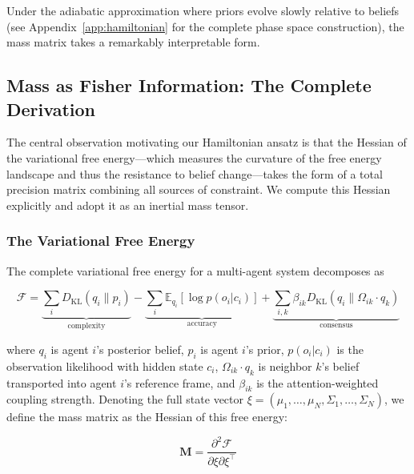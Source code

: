 \documentclass[12pt]{article}
\begin{document}
Under the adiabatic approximation where priors evolve slowly relative to beliefs 
(see Appendix~\ref{app:hamiltonian} for the complete phase space construction), 
the mass matrix takes a remarkably interpretable form.


\subsection{Mass as Fisher Information: The Complete Derivation}

The central observation motivating our Hamiltonian ansatz is that the Hessian of the variational free energy---which measures the curvature of the free energy landscape and thus the resistance to belief change---takes the form of a total precision matrix combining all sources of constraint. We compute this Hessian explicitly and adopt it as an inertial mass tensor.

\subsubsection{The Variational Free Energy}

The complete variational free energy for a multi-agent system decomposes as

\begin{equation}
\mathcal{F} = \underbrace{\sum_i D_{\mathrm{KL}}(q_i \| p_i)}_{\text{complexity}} - \underbrace{\sum_i \mathbb{E}_{q_i}[\log p(o_i|c_i)]}_{\text{accuracy}} + \underbrace{\sum_{i,k} \beta_{ik} D_{\mathrm{KL}}(q_i \| \Omega_{ik}\cdot q_k)}_{\text{consensus}}
\end{equation}

where $q_i$ is agent $i$'s posterior belief, $p_i$ is agent $i$'s prior, $p(o_i|c_i)$ is the observation likelihood with hidden state $c_i$, $\Omega_{ik}\cdot q_k$ is neighbor $k$'s belief transported into agent $i$'s reference frame, and $\beta_{ik}$ is the attention-weighted coupling strength. Denoting the full state vector $\xi = (\mu_1, \ldots, \mu_N, \Sigma_1, \ldots, \Sigma_N)$, we define the mass matrix as the Hessian of this free energy:

\begin{equation}
\mathbf{M} = \frac{\partial^2 \mathcal{F}}{\partial\xi\partial\xi^\top}
\end{equation}
\end{document}
